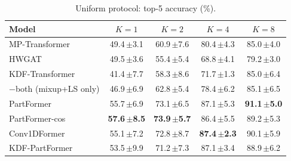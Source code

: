 \begin{table}[t]
\centering
\small
\caption{Uniform protocol: top-5 accuracy (\%).}
\label{tab:uniform5}
\begin{tabular}{lcccc}
\toprule
Model & $K=1$ & $K=2$ & $K=4$ & $K=8$ \\
\midrule
MP-Transformer & 49.4\,{\scriptsize$\pm$3.1} & 60.9\,{\scriptsize$\pm$7.6} & 80.4\,{\scriptsize$\pm$4.3} & 85.0\,{\scriptsize$\pm$4.0} \\
\midrule
HWGAT & 49.5\,{\scriptsize$\pm$3.6} & 55.4\,{\scriptsize$\pm$5.4} & 68.8\,{\scriptsize$\pm$4.1} & 79.2\,{\scriptsize$\pm$3.0} \\
\midrule
KDF-Transformer & 41.4\,{\scriptsize$\pm$7.7} & 58.3\,{\scriptsize$\pm$8.6} & 71.7\,{\scriptsize$\pm$1.3} & 85.0\,{\scriptsize$\pm$6.4} \\
\quad $-$both (mixup+LS only) & 46.9\,{\scriptsize$\pm$6.9} & 62.8\,{\scriptsize$\pm$5.4} & 78.4\,{\scriptsize$\pm$6.2} & 85.1\,{\scriptsize$\pm$6.5} \\
\midrule
PartFormer & 55.7\,{\scriptsize$\pm$6.9} & 73.1\,{\scriptsize$\pm$6.5} & 87.1\,{\scriptsize$\pm$5.3} & \textbf{91.1\,{\scriptsize$\pm$5.0}} \\
PartFormer-cos & \textbf{57.6\,{\scriptsize$\pm$8.5}} & \textbf{73.9\,{\scriptsize$\pm$5.7}} & 86.4\,{\scriptsize$\pm$5.5} & 89.2\,{\scriptsize$\pm$5.3} \\
Conv1DFormer & 55.1\,{\scriptsize$\pm$7.2} & 72.8\,{\scriptsize$\pm$8.7} & \textbf{87.4\,{\scriptsize$\pm$2.3}} & 90.1\,{\scriptsize$\pm$5.9} \\
KDF-PartFormer & 53.5\,{\scriptsize$\pm$9.9} & 71.2\,{\scriptsize$\pm$7.3} & 87.1\,{\scriptsize$\pm$3.4} & 88.9\,{\scriptsize$\pm$6.2} \\
\bottomrule
\end{tabular}
\end{table}
